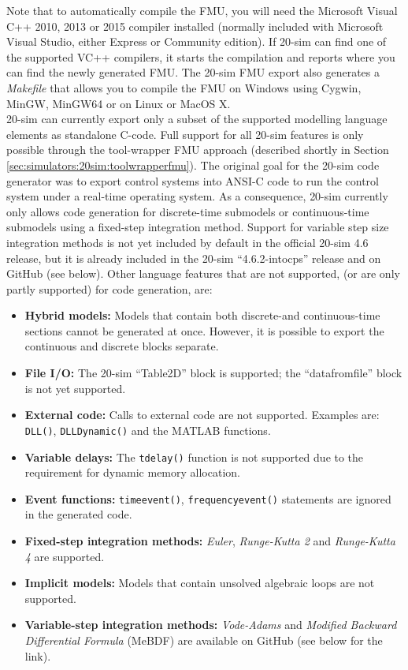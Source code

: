 %
%
%
Note that to automatically compile the FMU, you will need the Microsoft Visual C++ 2010, 2013 or 2015 compiler installed (normally included with Microsoft Visual Studio, either Express or Community edition).
%
If {20-sim} can find one of the supported VC++ compilers, it starts the compilation and reports where you can find the newly generated FMU.
%
The {20-sim} FMU export also generates a \textit{Makefile} that allows you to compile the FMU on Windows using Cygwin, MinGW, MinGW64 or on Linux or MacOS X.\\
%
{20-sim} can currently export only a subset of the supported modelling language elements as standalone C-code.
%
Full support for all {20-sim} features is only possible through the tool-wrapper FMU approach (described shortly in Section \ref{sec:simulators:20sim:toolwrapperfmu}).
%
The original goal for the {20-sim} code generator was to export control systems into ANSI-C code to run the control system under a real-time operating system.
%
As a consequence, {20-sim} currently only allows code generation for discrete-time submodels or continuous-time submodels using a fixed-step integration method.
%
Support for variable step size integration methods is not yet included by default in the official {20-sim} 4.6 release, but it is already included in the {20-sim} ``4.6.2-intocps'' release and on GitHub (see below).
%
Other language features that are not supported, (or are only partly supported) for code generation, are:
%
%
%
\begin{itemize}
\item \textbf{Hybrid models:} Models that contain both discrete-\@ and continuous-time sections cannot be generated at once. However, it is possible to export the continuous and discrete blocks separate.
\item \textbf{File I/O:} The 20-sim ``{Table2D}'' block is supported; the ``datafromfile'' block is not yet supported.
\item \textbf{External code:} Calls to external code are not supported. Examples are: \texttt{DLL()}, \texttt{DLLDynamic()} and the MATLAB functions.
\item \textbf{Variable delays:} The \texttt{tdelay()} function is not supported due to the requirement for dynamic memory allocation.
\item \textbf{Event functions:} \texttt{timeevent()}, \texttt{frequencyevent()} statements are ignored in the generated code.
\item \textbf{Fixed-step integration methods:} \textit{Euler}, \textit{Runge-Kutta 2} and \textit{Runge-Kutta 4} are supported.
\item \textbf{Implicit models:} Models that contain unsolved algebraic loops are not supported.
\item \textbf{Variable-step integration methods:} \textit{Vode-Adams} and \textit{Modified Backward Differential Formula} (MeBDF) are available on GitHub (see below for the link).
\end{itemize}

